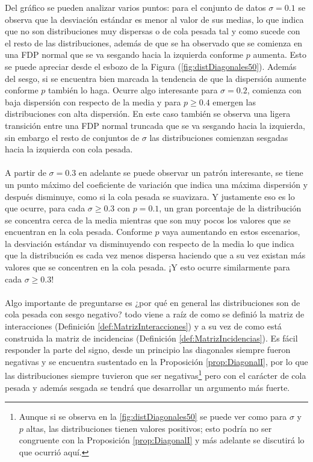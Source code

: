 \documentclass[a4paper,11pt]{book}
\theoremstyle{plain}
\theoremstyle{definition}
\begin{document}
Del gráfico se pueden analizar varios puntos: para el conjunto de datos $\sigma=0.1$ se observa que la desviación estándar es menor al valor de sus medias, lo que indica que no son distribuciones muy dispersas o de cola pesada tal y como sucede con el resto de las distribuciones, además de que se ha observado que se comienza en una FDP normal que se va sesgando hacia la izquierda conforme $p$ aumenta. Esto se puede apreciar desde el esbozo de la Figura (\ref{fig:distDiagonales50}). Además del sesgo, si se encuentra bien marcada la tendencia de que la dispersión aumente conforme $p$ también lo haga. Ocurre algo interesante para $\sigma=0.2$, comienza con baja dispersión con respecto de la media y para $p\geq0.4$ emergen las distribuciones con alta dispersión. En este caso también se observa una ligera transición entre una FDP normal truncada que se va sesgando hacia la izquierda, sin embargo el resto de conjuntos de $\sigma$ las distribuciones comienzan sesgadas hacia la izquierda con cola pesada.\\
\\
A partir de $\sigma=0.3$ en adelante se puede observar un patrón interesante, se tiene un punto máximo del coeficiente de variación que indica una máxima dispersión y después disminuye, como si la cola pesada se suavizara. Y justamente eso es lo que ocurre, para cada $\sigma\geq 0.3$ con $p=0.1$, un gran porcentaje de la distribución se concentra cerca de la media mientras que son muy pocos los valores que se encuentran en la cola pesada. Conforme $p$ vaya aumentando en estos escenarios, la desviación estándar va disminuyendo con respecto de la media lo que indica que la distribución es cada vez menos dispersa haciendo que a su vez existan más valores que se concentren en la cola pesada. ¡Y esto ocurre similarmente para cada $\sigma\geq 0.3$!\\
\\
Algo importante de preguntarse es ¿por qué en general las distribuciones son de cola pesada con sesgo negativo? todo viene a raíz de como se definió la matriz de interacciones (Definición \ref{def:MatrizInteracciones}) y a su vez de como está construida la matriz de incidencias (Definición \ref{def:MatrizIncidencias}). Es fácil responder la parte del signo, desde un principio las diagonales siempre fueron negativas y se encuentra sustentado en la Proposición \ref{prop:DiagonalI}, por lo que las distribuciones siempre tuvieron que ser negativas\footnote{Aunque si se observa en la \ref{fig:distDiagonales50} se puede ver como para $\sigma$ y $p$ altas, las distribuciones tienen valores positivos; esto podría no ser congruente con la Proposición \ref{prop:DiagonalI} y más adelante se discutirá lo que ocurrió aquí.} pero con el carácter de cola pesada y además sesgada se tendrá que desarrollar un argumento más fuerte.\\
\end{document}
